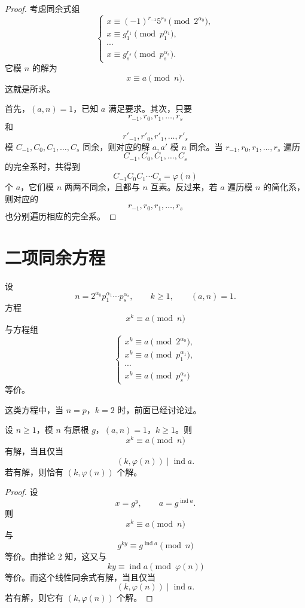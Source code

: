 \begin{proof}
	考虑同余式组
	\[
	\begin{cases}
		x\equiv (-1)^{r_{-1}}5^{r_0}\pmod {2^{\alpha_0}},\\
		x\equiv g_1^{r_1}\pmod {p_1^{\alpha_1}},\\
		\cdots\\
		x\equiv g_s^{r_s}\pmod {p_s^{\alpha_s}}.
	\end{cases}
	\]
	它模 $n$ 的解为
	\[
		x\equiv a\pmod n.
	\]
	这就是所求。

	首先，$(a,n)=1$，已知 $a$ 满足要求。其次，只要
	\[
		r_{-1},r_0,r_1,\ldots,r_s
	\]
	和
	\[
		r'_{-1},r'_0,r'_1,\ldots,r'_s
	\]
	模 $C_{-1},C_0,C_1,\ldots,C_s$ 同余，则对应的解 $a,a'$ 模 $n$ 同余。当 $r_{-1},r_0,r_1,\ldots,r_s$ 遍历
	\[
		C_{-1},C_0,C_1,\ldots,C_s
	\]
	的完全系时，共得到
	\[
		C_{-1}C_0C_1\cdots C_s=\varphi(n)
	\]
	个 $a$，它们模 $n$ 两两不同余，且都与 $n$ 互素。反过来，若 $a$ 遍历模 $n$ 的简化系，则对应的
	\[
		r_{-1},r_0,r_1,\ldots,r_s
	\]
	也分别遍历相应的完全系。
\end{proof}

\section{二项同余方程}

设
\[
	n=2^{\alpha_0}p_1^{\alpha_1}\cdots p_s^{\alpha_s},
	\qquad
	k\geq 1,
	\qquad
	(a,n)=1.
\]
方程
\[
	x^k\equiv a\pmod n
\]
与方程组
\[
\begin{cases}
	x^k\equiv a\pmod {2^{\alpha_0}},\\
	x^k\equiv a\pmod {p_1^{\alpha_1}},\\
	\cdots\\
	x^k\equiv a\pmod {p_s^{\alpha_s}}
\end{cases}
\]
等价。

这类方程中，当 $n=p$，$k=2$ 时，前面已经讨论过。

\begin{theorem}[原文 定理 25]
	设 $n\geq 1$，模 $n$ 有原根 $g$，$(a,n)=1$，$k\geq 1$。则
	\[
		x^k\equiv a\pmod n
	\]
	有解，当且仅当
	\[
		(k,\varphi(n))\mid \operatorname{ind}a.
	\]
	若有解，则恰有 $(k,\varphi(n))$ 个解。
\end{theorem}

\begin{proof}
	设
	\[
		x=g^y,\qquad a=g^{\operatorname{ind}a}.
	\]
	则
	\[
		x^k\equiv a\pmod n
	\]
	与
	\[
		g^{ky}\equiv g^{\operatorname{ind}a}\pmod n
	\]
	等价。由推论 2 知，这又与
	\[
		ky\equiv \operatorname{ind}a\pmod{\varphi(n)}
	\]
	等价。而这个线性同余式有解，当且仅当
	\[
		(k,\varphi(n))\mid \operatorname{ind}a.
	\]
	若有解，则它有 $(k,\varphi(n))$ 个解。
\end{proof}

